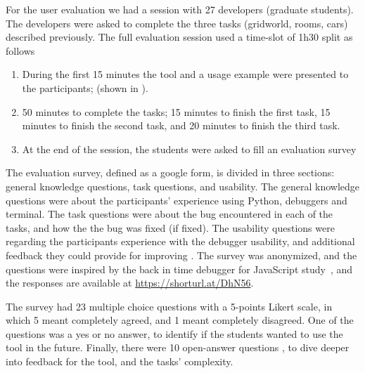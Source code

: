 For the user evaluation we had a session with 27 developers (\ie graduate students). 
The developers were asked to complete the three tasks (\ie gridworld, rooms, cars) described previously. The full evaluation session used a time-slot of 1h30 split as follows 
\begin{enumerate}[label=(\arabic*)]
\item During the first 15 minutes the tool and a usage example were presented to the participants; (shown in ).
\item 50 minutes to complete the tasks; 15 minutes to finish the first task, 15 minutes to finish the second task, and  20 minutes to finish the third task. 
\item At the end of the session, the students were asked to fill an evaluation survey 
\end{enumerate}

The evaluation survey, defined as a google form, is divided in three sections: general knowledge questions, task questions, and usability.
The general knowledge questions were about the participants' experience  using Python, debuggers and  terminal. The task questions were about the bug encountered in each of the tasks, and how the the bug was fixed (if fixed). The usability  questions were regarding the participants experience with the debugger usability, and additional feedback they could provide for improving \flik. The survey was anonymized, and the questions were inspired by the 
back in time debugger for JavaScript study~\cite{leger23}, and the responses are available 
at \url{https://shorturl.at/DhN56}. 

The survey had 23 multiple choice questions with a 5-points Likert scale,  in which 5 meant completely agreed, and 1 meant completely disagreed. One of the questions was a yes or no answer, to identify if the students wanted to use the tool in the future. Finally, there were 10 open-answer questions , to dive deeper into feedback for the tool, and the tasks' complexity.





\endinput

